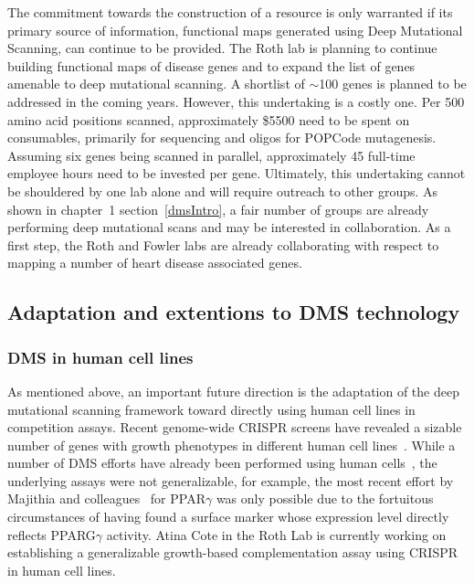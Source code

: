 The commitment towards the construction of a resource is only warranted if its primary source of information, functional maps generated using Deep Mutational Scanning, can continue to be provided. The Roth lab is planning to continue building functional maps of disease genes and to expand the list of genes amenable to deep mutational scanning. A shortlist of $\sim$100 genes is planned to be addressed in the coming years. However, this undertaking is a costly one. Per 500 amino acid positions scanned, approximately \$5500 need to be spent on consumables, primarily for sequencing and oligos for POPCode mutagenesis. Assuming six genes being scanned in parallel, approximately 45 full-time employee hours need to be invested per gene. Ultimately, this undertaking cannot be shouldered by one lab alone and will require outreach to other groups. As shown in chapter~1 section~\ref{dmsIntro}, a fair number of groups are already performing deep mutational scans and may be interested in collaboration. As a first step, the Roth and Fowler labs are already collaborating with respect to mapping a number of heart disease associated genes.

\subsection{Adaptation and extentions to DMS technology}
\subsubsection{DMS in human cell lines}
As mentioned above, an important future direction is the adaptation of the deep mutational scanning framework toward directly using human cell lines in competition assays. Recent genome-wide CRISPR screens have revealed a sizable number of genes with growth phenotypes in different human cell lines~\cite{hart_high-resolution_2015,blomen_gene_2015,wang_genetic_2014}. While a number of DMS efforts have already been performed using human cells~\cite{forsyth_deep_2013,wagenaar_resistance_2014,doud_site-specific_2015,majithia_prospective_2016}, the underlying assays were not generalizable, for example, the most recent effort by Majithia and colleagues~\cite{majithia_prospective_2016} for PPAR$\gamma$ was only possible due to the fortuitous circumstances of having found a surface marker whose expression level directly reflects PPARG$\gamma$ activity. 
Atina Cote in the Roth Lab is currently working on establishing a generalizable growth-based complementation assay using CRISPR in human cell lines. 

